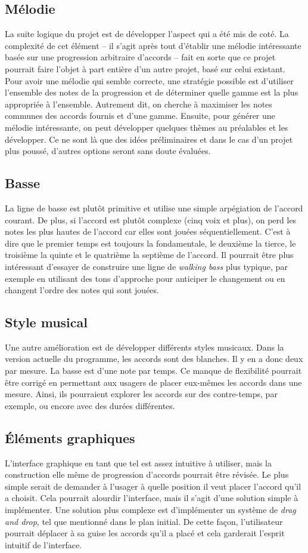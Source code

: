 \documentclass[letterpaper,12pt]{scrartcl}
\begin{document}
		\subsection{Mélodie}
		La suite logique du projet est de développer l'aspect qui a été mis de coté. La complexité de cet élément -- il s'agit après tout d'établir une mélodie intéressante basée sur une progression arbitraire d'accords -- fait en sorte que ce projet pourrait faire l'objet à part entière d'un autre projet, basé sur celui existant. Pour avoir une mélodie qui semble correcte, une stratégie possible est d'utiliser l'ensemble des notes de la progression et de déterminer quelle gamme est la plus appropriée à l'ensemble. Autrement dit, on cherche à maximiser les notes communes des accords fournis et d'une gamme. Ensuite, pour générer une mélodie intéressante, on peut développer quelques thèmes au préalables et les développer. Ce ne sont là que des idées préliminaires et dans le cas d'un projet plus poussé, d'autres options seront sans doute évaluées.
		\subsection{Basse}
		La ligne de basse est plutôt primitive et utilise une simple arpégiation de l'accord courant. De plus, si l'accord est plutôt complexe (cinq voix et plus), on perd les notes les plus hautes de l'accord car elles sont jouées séquentiellement. C'est à dire que le premier temps est toujours la fondamentale, le deuxième la tierce, le troisième la quinte et le quatrième la septième de l'accord. Il pourrait être plus intéressant d'essayer de construire une ligne de \textit{walking bass} plus typique, par exemple en utilisant des tons d'approche pour anticiper le changement ou en changent l'ordre des notes qui sont jouées.
		
		\subsection{Style musical}
		Une autre amélioration est de développer différents styles musicaux. Dans la version actuelle du programme, les accords sont des blanches. Il y en a donc deux par mesure. La basse est d'une note par temps. Ce manque de flexibilité pourrait être corrigé en permettant aux usagers de placer eux-mêmes les accords dans une mesure. Ainsi, ils pourraient explorer les accords sur des contre-temps, par exemple, ou encore avec des durées différentes.
		\subsection{Éléments graphiques}
		L'interface graphique en tant que tel est assez intuitive à utiliser, mais la construction elle même de progression d'accords pourrait être révisée. Le plus simple serait de demander à l'usager à quelle position il veut placer l'accord qu'il a choisit. Cela pourrait alourdir l'interface, mais il s'agit d'une solution simple à implémenter. Une solution plus complexe est d'implémenter un système de \textit{drag and drop}, tel que mentionné dans le plan initial. De cette façon, l'utilisateur pourrait déplacer à sa guise les accords qu'il a placé et cela garderait l'esprit intuitif de l'interface.
\end{document}
